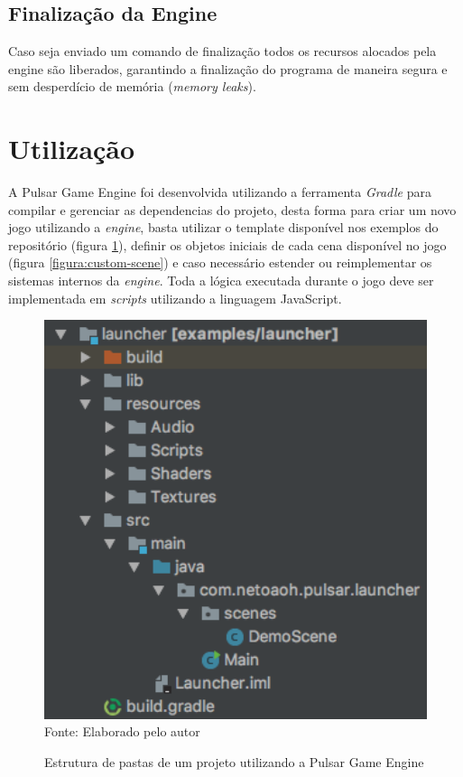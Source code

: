 \documentclass[12pt,	openright, twoside,	a4paper, english, french, spanish, brazil]{abntex2}
\begin{document}
\subsection{Finalização da Engine}
Caso seja enviado um comando de finalização todos os recursos alocados pela engine são liberados, garantindo a finalização do programa de maneira segura e sem desperdício de memória (\textit{memory leaks}). 


%
%

\section{Utilização}

A Pulsar Game Engine foi desenvolvida utilizando a ferramenta \textit{Gradle} para compilar e gerenciar as dependencias do projeto, desta forma para criar um novo jogo utilizando a \textit{engine}, basta utilizar o template disponível nos exemplos do repositório (figura \ref{figura:estrutura-pastas}), definir os objetos iniciais de cada cena disponível no jogo (figura \ref{figura:custom-scene}) e caso necessário estender ou reimplementar os sistemas internos da \textit{engine}. Toda a lógica executada durante o jogo deve ser implementada em \textit{scripts} utilizando a linguagem JavaScript.

\begin{figure}[H]
\centering
\caption{Estrutura de pastas de um projeto utilizando a Pulsar Game Engine}
\includegraphics[width=12cm]{imagens/estrutura-pastas.png}
\\
\small{Fonte: Elaborado pelo autor}
\label{figura:estrutura-pastas}
\end{figure}
\end{document}
